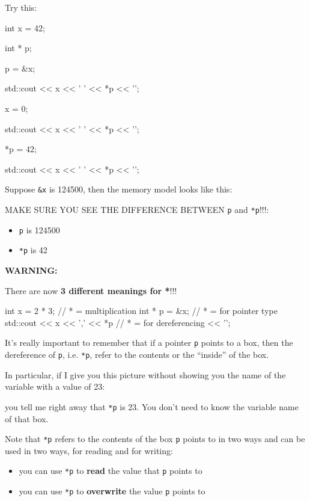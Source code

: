 \begin{ex}
\begin{consolethree}[escapeinside=||]
Try this:

\begin{consolethree}[escapeinside=||]

int x = 42;

int * p;

p = \&x;

std::cout << x << ' '
<< *p << '\n';

x = 0;

std::cout << x << ' '
<< *p << '\n';

*p = 42;

std::cout << x << ' '
<< *p << '\n';
\end{consolethree}
Suppose \texttt{\&x} is 124500, then the memory model looks like this:

MAKE SURE YOU SEE THE DIFFERENCE BETWEEN \texttt{p} and \texttt{*p}!!!:

\begin{itemize}
\item
  \texttt{p} is 124500
\item
  \texttt{*p} is 42
\end{itemize}

\textbf{WARNING:}

There are now \textbf{3 different meanings for *}!!!

\begin{consolethree}[escapeinside=||]
int x = 2 * 3;           // * = multiplication
int * p = &x;            // * = for pointer type
std::cout << x
          << ',' << *p   // * = for dereferencing
          << '\n';
\end{consolethree}
It's really important to remember that if a pointer \texttt{p} points to a box, then the dereference of \texttt{p}, i.e. \texttt{*p}, refer to the contents or the ``inside'' of the box.

In particular, if I give you this picture without showing you the name of the variable with a value of 23:

you tell me right away that \texttt{*p} is 23. You don't need to know the variable name of that box.

Note that \texttt{*p} refers to the contents of the box \texttt{p} points to in two ways and can be used in two ways, for reading and for writing:

\begin{itemize}
\item
  you can use \texttt{*p} to \textbf{read} the value that \texttt{p} points
  to
\item
  you can use \texttt{*p} to \textbf{overwrite} the value \texttt{p} points
  to
\end{itemize}


\end{consolethree}
\end{ex}
